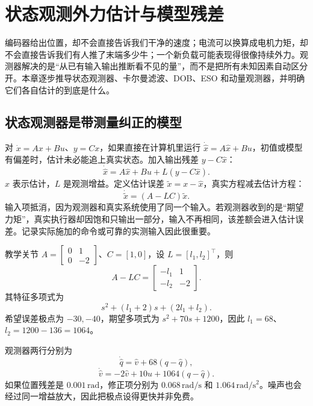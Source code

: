 \chapter{状态观测外力估计与模型残差}
\label{ch:observers}

编码器给出位置，却不会直接告诉我们干净的速度；电流可以换算成电机力矩，却不会直接告诉我们有人推了末端多少牛；一个新负载可能表现得很像持续外力。观测器解决的是“从已有输入输出推断看不见的量”，而不是把所有未知因素自动区分开。本章逐步推导状态观测器、卡尔曼滤波、DOB、ESO 和动量观测器，并明确它们各自估计的到底是什么。

\section{状态观测器是带测量纠正的模型}

对 $\dot x=Ax+Bu$、$y=Cx$，如果直接在计算机里运行 $\dot{\hat x}=A\hat x+Bu$，初值或模型有偏差时，估计未必能追上真实状态。加入输出残差 $y-C\hat x$：
\begin{equation}
\dot{\hat x}=A\hat x+Bu+L(y-C\hat x).
\end{equation}
$\hat x$ 表示估计，$L$ 是观测增益。定义估计误差 $\tilde x=x-\hat x$，真实方程减去估计方程：
\begin{equation}
\dot{\tilde x}=(A-LC)\tilde x.
\end{equation}
输入项抵消，因为观测器和真实系统使用了同一个输入。若观测器收到的是“期望力矩”，真实执行器却因饱和只输出一部分，输入不再相同，该差额会进入估计误差。记录实际施加的命令或可靠的实测输入因此很重要。

\begin{examplebox}[算例 14A 用位置估计关节速度]
教学关节 $A=\left[\begin{smallmatrix}0&1\\0&-2\end{smallmatrix}\right]$、$C=[1,0]$，设 $L=[l_1,l_2]^\top$，则
\[
A-LC=\begin{bmatrix}-l_1&1\\-l_2&-2\end{bmatrix}.
\]
其特征多项式为
\[
s^2+(l_1+2)s+(2l_1+l_2).
\]
希望误差极点为 $-30,-40$，期望多项式为 $s^2+70s+1200$，因此 $l_1=68$、$l_2=1200-136=1064$。

观测器两行分别为
\[
\dot{\hat q}=\hat v+68(q-\hat q),
\]
\[
\dot{\hat v}=-2\hat v+10u+1064(q-\hat q).
\]
如果位置残差是 $0.001\,\mathrm{rad}$，修正项分别为 $0.068\,\mathrm{rad/s}$ 和 $1.064\,\mathrm{rad/s^2}$。噪声也会经过同一增益放大，因此把极点设得更快并非免费。
\end{examplebox}

